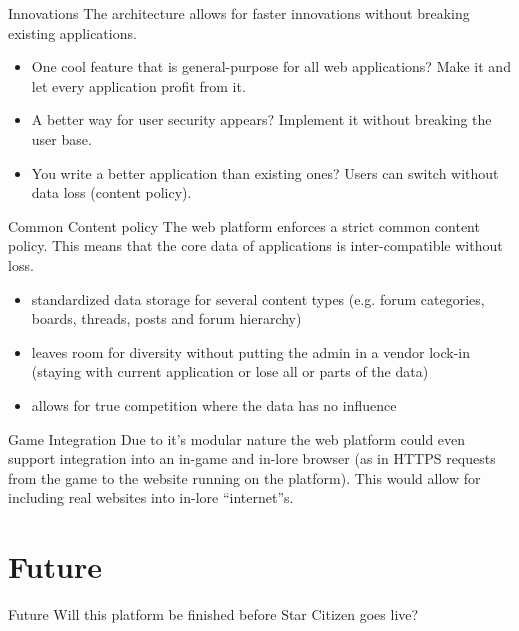 \documentclass{beamer}
\begin{document}
	\begin{frame}{Innovations}
		The architecture allows for faster innovations without breaking existing applications.
		\begin{itemize}
			\item One cool feature that is general-purpose for all web applications? Make it and let every application profit from it.
			\item A better way for user security appears? Implement it without breaking the user base.
			\item You write a better application than existing ones? Users can switch without data loss (content policy).
		\end{itemize}
	\end{frame}
	\begin{frame}{Common Content policy}
		The web platform enforces a strict common content policy. This means that the core data of applications is inter-compatible without loss.
		
		\begin{itemize}
			\item standardized data storage for several content types (e.g. forum categories, boards, threads, posts and forum hierarchy)
			\item leaves room for diversity without putting the admin in a vendor lock-in (staying with current application or lose all or parts of the data)
			\item allows for true competition where the data has no influence
		\end{itemize}
	\end{frame}
	\begin{frame}{Game Integration}
		Due to it's modular nature the web platform could even support integration into an in-game and in-lore browser (as in HTTPS requests from the game to the website running on the platform). This would allow for including real websites into in-lore ``internet''s.
	\end{frame}
	
	\section{Future}
	\begin{frame}{Future}
		\centering Will this platform be finished before Star Citizen goes live?
	\end{frame}
\end{document}
